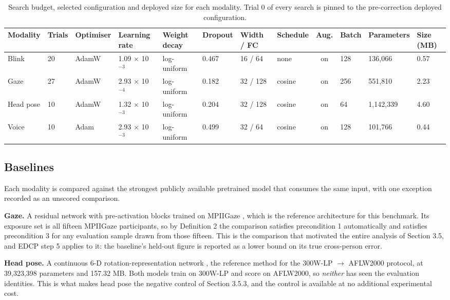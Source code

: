 \begin{table}[pos=htbp]
\centering
\caption{Search budget, selected configuration and deployed size for each modality. Trial 0 of every search is pinned to the pre-correction deployed configuration.}
\label{tab:8}
\scriptsize
\begin{tabularx}{\textwidth}{XXXXXXXXcXXX}
\toprule
\textbf{Modality} & \textbf{Trials} & \textbf{Optimiser} & \textbf{Learning rate} & \textbf{Weight decay} & \textbf{Dropout} & \textbf{Width / FC} & \textbf{Schedule} & \textbf{Aug.} & \textbf{Batch} & \textbf{Parameters} & \textbf{Size (MB)} \\
\midrule
Blink & 20 & AdamW & 1.09 $\times$ 10$^{-3}$ & log-uniform & 0.467 & 16 / 64 & none & on & 128 & 136,066 & 0.57 \\
Gaze & 27 & AdamW & 2.93 $\times$ 10$^{-4}$ & log-uniform & 0.182 & 32 / 128 & cosine & on & 256 & 551,810 & 2.23 \\
Head pose & 10 & AdamW & 1.32 $\times$ 10$^{-3}$ & log-uniform & 0.204 & 32 / 128 & cosine & on & 64 & 1,142,339 & 4.60 \\
Voice & 10 & Adam & 2.93 $\times$ 10$^{-3}$ & log-uniform & 0.499 & 32 / 64 & cosine & on & 128 & 101,766 & 0.44 \\
\bottomrule
\end{tabularx}
\end{table}

\FloatBarrier

\subsection{Baselines}

Each modality is compared against the strongest publicly available pretrained model that consumes the same input, with one exception recorded as an unscored comparison.

\textbf{Gaze.} A residual network  with pre-activation blocks  trained on MPIIGaze , which is the reference architecture for this benchmark. Its exposure set is all fifteen MPIIGaze participants, so by Definition 2 the comparison satisfies precondition 1 automatically and satisfies precondition 3 for any evaluation sample drawn from those fifteen. This is the comparison that motivated the entire analysis of Section 3.5, and EDCP step 5 applies to it: the baseline's held-out figure is reported as a lower bound on its true cross-person error.

\textbf{Head pose.} A continuous 6-D rotation-representation network , the reference method for the 300W-LP $\to$ AFLW2000 protocol, at 39,323,398 parameters and 157.32 MB. Both models train on 300W-LP and score on AFLW2000, so \emph{neither} has seen the evaluation identities. This is what makes head pose the negative control of Section 3.5.3, and the control is available at no additional experimental cost.

